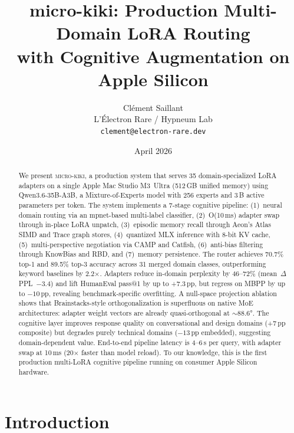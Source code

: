 \documentclass[11pt,a4paper]{article}
\title{\textbf{micro-kiki}: Production Multi-Domain LoRA Routing\\with Cognitive Augmentation on Apple Silicon}
\author{
  Cl\'{e}ment Saillant \\
  L'\'{E}lectron Rare / Hypneum Lab \\
  \texttt{clement@electron-rare.dev}
}
\date{April 2026}
\begin{document}
\maketitle

\begin{abstract}
We present \textsc{micro-kiki}, a production system that serves 35 domain-specialized LoRA adapters on a single Apple Mac Studio M3~Ultra (512\,GB unified memory) using Qwen3.6-35B-A3B, a Mixture-of-Experts model with 256 experts and 3\,B active parameters per token. The system implements a 7-stage cognitive pipeline: (1)~neural domain routing via an mpnet-based multi-label classifier, (2)~O(10\,ms) adapter swap through in-place LoRA unpatch, (3)~episodic memory recall through Aeon's Atlas SIMD and Trace graph stores, (4)~quantized MLX inference with 8-bit KV cache, (5)~multi-perspective negotiation via CAMP and Catfish, (6)~anti-bias filtering through KnowBias and RBD, and (7)~memory persistence. The router achieves 70.7\% top-1 and 89.5\% top-3 accuracy across 31 merged domain classes, outperforming keyword baselines by 2.2$\times$. Adapters reduce in-domain perplexity by 46--72\% (mean~$\Delta$PPL~$-3.4$) and lift HumanEval pass@1 by up to +7.3\,pp, but regress on MBPP by up to $-10$\,pp, revealing benchmark-specific overfitting. A null-space projection ablation shows that Brainstacks-style orthogonalization is superfluous on native MoE architectures: adapter weight vectors are already quasi-orthogonal at ${\sim}88.6$°. The cognitive layer improves response quality on conversational and design domains (+7\,pp composite) but degrades purely technical domains ($-13$\,pp embedded), suggesting domain-dependent value. End-to-end pipeline latency is 4--6\,s per query, with adapter swap at 10\,ms (20$\times$ faster than model reload). To our knowledge, this is the first production multi-LoRA cognitive pipeline running on consumer Apple Silicon hardware.
\end{abstract}

\section{Introduction}
\label{sec:intro}
\end{document}
